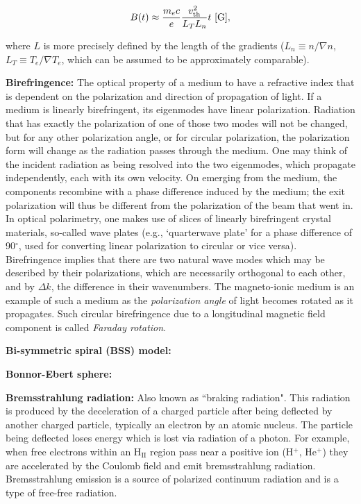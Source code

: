 \documentclass[a4paper,10pt]{article}
\begin{document}
\begin{align*}
    B(t) \approx \frac{m_ec}{e}\frac{v_{\rm th}^2}{L_TL_n}t ~ [{\rm G}],
\end{align*}

{\noindent}where $L$ is more precisely defined by the length of the gradients ($L_n\equiv n/\nabla n$, $L_T\equiv T_e/\nabla T_e$, which can be assumed to be approximately comparable).

{\noindent}\textbf{Birefringence:} The optical property of a medium to have a refractive index that is dependent on the polarization and direction of propagation of light. If a medium is linearly birefringent, its eigenmodes have linear polarization. Radiation that has exactly the polarization of one of those two modes will not be changed, but for any other polarization angle, or for circular polarization, the polarization form will change as the radiation passes through the medium. One may think of the incident radiation as being resolved into the two eigenmodes, which propagate independently, each with its own velocity. On emerging from the medium, the components recombine with a phase difference induced by the medium; the exit polarization will thus be different from the polarization of the beam that went in. In optical polarimetry, one makes use of slices of linearly birefringent crystal materials, so-called wave plates (e.g., `quarterwave plate' for a phase difference of 90$^\circ$, used for converting linear polarization to circular or vice versa). Birefringence implies that there are two natural wave modes which may be described by their polarizations, which are necessarily orthogonal to each other, and by $\Delta k$, the difference in their wavenumbers. The magneto-ionic medium is an example of such a medium as the \textit{polarization angle} of light becomes rotated as it propagates. Such circular birefringence due to a longitudinal magnetic field component is called \textit{Faraday rotation}.

{\noindent}\textbf{Bi-symmetric spiral (BSS) model:}

{\noindent}\textbf{Bonnor-Ebert sphere:}

{\noindent}\textbf{Bremsstrahlung radiation:} Also known as ``braking radiation". This radiation is produced by the deceleration of a charged particle after being deflected by another charged particle, typically an electron by an atomic nucleus. The particle being deflected loses energy which is lost via radiation of a photon. For example, when free electrons within an H$_\mathrm{II}$ region pass near a positive ion (H$^+$, He$^+$) they are accelerated by the Coulomb field and emit bremsstrahlung radiation. Bremsstrahlung emission is a source of polarized continuum radiation and is a type of free-free radiation.
\end{document}
